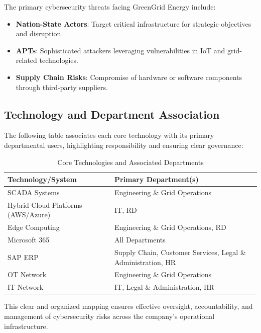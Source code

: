 The primary cybersecurity threats facing GreenGrid Energy include:

\begin{itemize}
    \item \textbf{Nation-State Actors}: Target critical infrastructure for strategic objectives and disruption.
    \item \textbf{\ac{APTs}}: Sophisticated attackers leveraging vulnerabilities in IoT and grid-related technologies.
    \item \textbf{Supply Chain Risks}: Compromise of hardware or software components through third-party suppliers.
\end{itemize}

\subsection{Technology and Department Association}
\label{sec:assets}

The following table associates each core technology with its primary departmental users, highlighting responsibility and ensuring clear governance:

\begin{table}[ht]
    \centering
    \caption{Core Technologies and Associated Departments}
    \label{tab:tech-departments}
    \begin{tabular}{|>{\raggedright\arraybackslash}p{7cm}|>{\raggedright\arraybackslash}p{9cm}|}
        \hline
        \textbf{Technology/System}         & \textbf{Primary Department(s)}                                    \\ \hline
        \ac{SCADA} Systems                 & Engineering \& Grid Operations                                    \\ \hline
        Hybrid Cloud Platforms (AWS/Azure) & IT, \ac{RD}                                                       \\ \hline
        Edge Computing                     & Engineering \& Grid Operations, \ac{RD}                           \\ \hline
        Microsoft 365                      & All Departments                                                   \\ \hline
        SAP \ac{ERP}                       & Supply Chain, Customer Services, Legal \& Administration, \ac{HR} \\ \hline
        \ac{OT} Network                    & Engineering \& Grid Operations                                    \\ \hline
        \ac{IT} Network                    & IT, Legal \& Administration, \ac{HR}                              \\ \hline
    \end{tabular}
\end{table}

This clear and organized mapping ensures effective oversight, accountability, and management of cybersecurity risks across the company's operational infrastructure.

